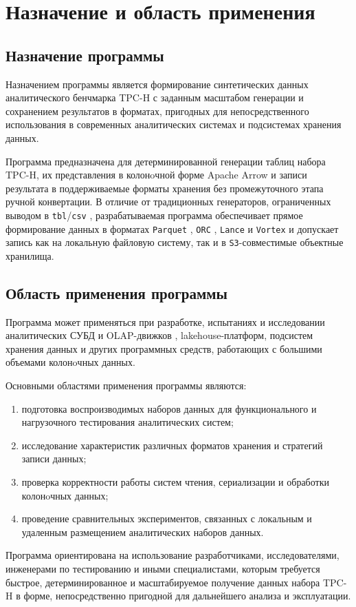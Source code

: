 \section{Назначение и область применения}

\subsection{Назначение программы}

Назначением программы является формирование синтетических данных аналитического
бенчмарка TPC-H  с заданным масштабом генерации и сохранением результатов в
форматах, пригодных для непосредственного использования в современных
аналитических системах и подсистемах хранения данных.

Программа предназначена для детерминированной генерации таблиц набора TPC-H,
их представления в колонoчной форме Apache Arrow  и записи результата в
поддерживаемые форматы хранения без промежуточного этапа ручной конвертации.
В отличие от традиционных генераторов, ограниченных выводом в
\texttt{tbl}/\texttt{csv} , разрабатываемая программа обеспечивает
прямое формирование данных в форматах \texttt{Parquet} ,
\texttt{ORC} , \texttt{Lance}  и \texttt{Vortex}
 и допускает запись как на
локальную файловую систему, так и в \texttt{S3}-совместимые объектные
хранилища.

\subsection{Область применения программы}

Программа может применяться при разработке, испытаниях и исследовании
аналитических СУБД и OLAP-движков , lakehouse-платформ,
подсистем хранения данных и
других программных средств, работающих с большими объемами колонoчных данных.

Основными областями применения программы являются:
\begin{enumerate}
    \item подготовка воспроизводимых наборов данных для функционального и
    нагрузочного тестирования аналитических систем;
    \item исследование характеристик различных форматов хранения и стратегий
    записи данных;
    \item проверка корректности работы систем чтения, сериализации и обработки
    колонoчных данных;
    \item проведение сравнительных экспериментов, связанных с локальным и
    удаленным размещением аналитических наборов данных.
\end{enumerate}

Программа ориентирована на использование разработчиками, исследователями,
инженерами по тестированию и иными специалистами, которым требуется быстрое,
детерминированное и масштабируемое получение данных набора TPC-H в форме,
непосредственно пригодной для дальнейшего анализа и эксплуатации.
